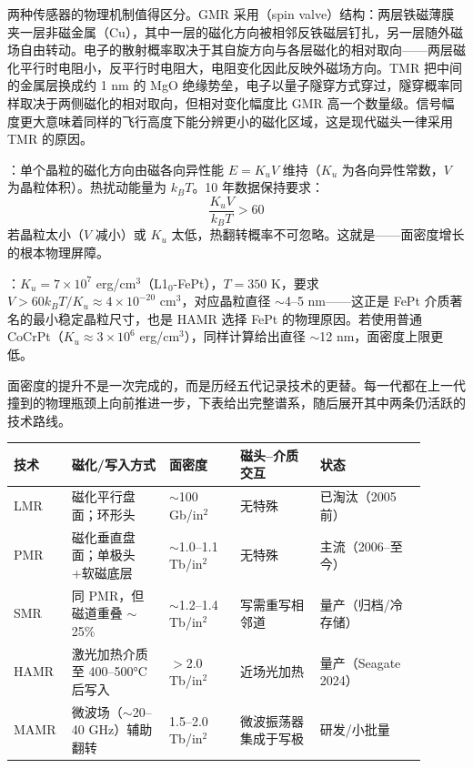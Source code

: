 两种传感器的物理机制值得区分。GMR 采用（spin valve）结构：两层铁磁薄膜夹一层非磁金属（Cu），其中一层的磁化方向被相邻反铁磁层钉扎，另一层随外磁场自由转动。电子的散射概率取决于其自旋方向与各层磁化的相对取向——两层磁化平行时电阻小，反平行时电阻大，电阻变化因此反映外磁场方向。TMR 把中间的金属层换成约 1 nm 的 MgO 绝缘势垒，电子以量子隧穿方式穿过，隧穿概率同样取决于两侧磁化的相对取向，但相对变化幅度比 GMR 高一个数量级。信号幅度更大意味着同样的飞行高度下能分辨更小的磁化区域，这是现代磁头一律采用 TMR 的原因。

：单个晶粒的磁化方向由磁各向异性能 $E = K_u V$ 维持（$K_u$ 为各向异性常数，$V$ 为晶粒体积）。热扰动能量为 $k_B T$。10 年数据保持要求：
\[
\frac{K_u V}{k_B T} > 60
\]
若晶粒太小（$V$ 减小）或 $K_u$ 太低，热翻转概率不可忽略。这就是——面密度增长的根本物理屏障。

：$K_u = 7 \times 10^7$ erg/cm$^3$（L1$_0$-FePt），$T = 350$ K，要求 $V > 60 k_B T / K_u \approx 4 \times 10^{-20}$ cm$^3$，对应晶粒直径 $\sim$4--5 nm——这正是 FePt 介质著名的最小稳定晶粒尺寸，也是 HAMR 选择 FePt 的物理原因。若使用普通 CoCrPt（$K_u \approx 3 \times 10^6$ erg/cm$^3$），同样计算给出直径 $\sim$12 nm，面密度上限更低。


面密度的提升不是一次完成的，而是历经五代记录技术的更替。每一代都在上一代撞到的物理瓶颈上向前推进一步，下表给出完整谱系，随后展开其中两条仍活跃的技术路线。

\begin{longtable}{L{0.10\linewidth}L{0.22\linewidth}L{0.16\linewidth}L{0.18\linewidth}L{0.24\linewidth}}
\toprule
技术 & 磁化/写入方式 & 面密度 & 磁头--介质交互 & 状态 \\
\midrule
LMR & 磁化平行盘面；环形头 & $\sim$100 Gb/in$^2$ & 无特殊 & 已淘汰（2005 前） \\
PMR & 磁化垂直盘面；单极头+软磁底层 & $\sim$1.0--1.1 Tb/in$^2$ & 无特殊 & 主流（2006--至今） \\
SMR & 同 PMR，但磁道重叠 $\sim$25\% & $\sim$1.2--1.4 Tb/in$^2$ & 写需重写相邻道 & 量产（归档/冷存储） \\
HAMR & 激光加热介质至 400--500°C 后写入 & $>$2.0 Tb/in$^2$ & 近场光加热 & 量产（Seagate 2024） \\
MAMR & 微波场（$\sim$20--40 GHz）辅助翻转 & 1.5--2.0 Tb/in$^2$ & 微波振荡器集成于写极 & 研发/小批量 \\
\bottomrule
\end{longtable}

